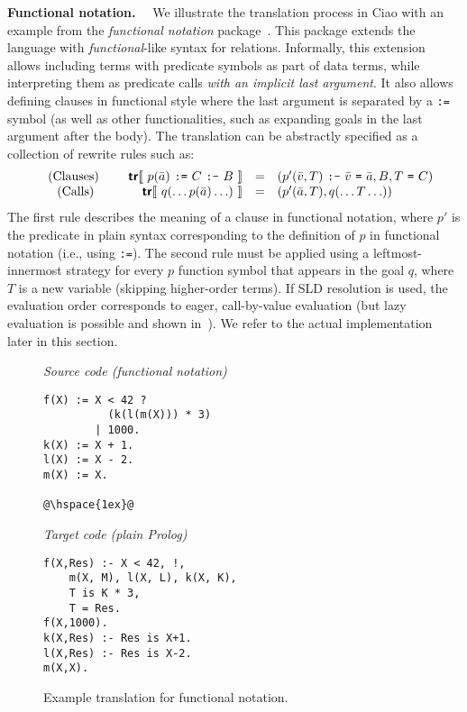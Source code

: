 \documentclass[preprint]{llncs}
\begin{document}
\vspace{1.5ex}
\noindent\textbf{Functional notation.}~~ We illustrate the translation
process in Ciao with an example from the \emph{functional notation}
package~\cite{functional-lazy-notation-flops2006}. This package extends
the language with \emph{functional}-like syntax for relations. Informally,
this extension allows including terms with predicate symbols as part of
data terms, while interpreting them as predicate calls \emph{with an
implicit last argument}. It also allows defining clauses in functional
style where the last argument is separated by a
\texttt{:=} symbol (as well as other functionalities, such as expanding
goals in the last argument after the body).  The translation can be
abstractly specified as a collection of rewrite rules such as:
\begin{displaymath}
  \begin{array}{crcl}
    \mbox{\ \ \ (Clauses) \ \ \ } & \mbox{\textsf{\textbf{tr}}}\llbracket~p(\bar{a}) ~\mbox{\tt :=}~ C ~\mbox{\tt :-}~ B~\rrbracket & = & (p'(\bar{v}, T) ~\mbox{\tt :-}~ \bar{v} ~\mbox{\tt =}~ \bar{a}, B, T~\mbox{\tt =}~C) \\
    \mbox{(Calls)} & \mbox{\textsf{\textbf{tr}}}\llbracket~q(\ldots p(\bar{a}) \ldots)~\rrbracket & = & (p'(\bar{a},T), q(\ldots T \ldots)) \\
  \end{array}
\end{displaymath}
The first rule describes the meaning of a clause in functional
notation, where $p'$ is the predicate in plain syntax 
corresponding to the definition of $p$ in functional notation (i.e.,
using \texttt{:=}). The second 
rule must be applied using a leftmost-innermost strategy for every $p$
function symbol that appears in the goal $q$, where $T$ is a new
variable (skipping higher-order terms).
If SLD resolution is used, the evaluation order corresponds to eager,
call-by-value evaluation (but lazy evaluation is possible and shown
in~\cite{functional-lazy-notation-flops2006}). 
We refer to the actual implementation later in this section.

\begin{figure}[t]
  \centering\small
  \begin{minipage}{0.45\linewidth}
    \emph{Source code (functional notation)}
\begin{lstlisting}[numbers=none,frame=r]
f(X) := X < 42 ?          
          (k(l(m(X))) * 3)
        | 1000.           
k(X) := X + 1.
l(X) := X - 2.
m(X) := X.

@\hspace{1ex}@
\end{lstlisting}
  \end{minipage}
  \hspace{1ex}
  \begin{minipage}{0.45\linewidth}
    \emph{Target code (plain Prolog)}
\begin{lstlisting}[numbers=none,frame=none]
f(X,Res) :- X < 42, !, 
    m(X, M), l(X, L), k(X, K),
    T is K * 3,
    T = Res.
f(X,1000).
k(X,Res) :- Res is X+1. 
l(X,Res) :- Res is X-2.
m(X,X).
\end{lstlisting}
  \end{minipage}
  \caption{Example translation for functional notation.}
  \label{fig:functional}
\end{figure}
\end{document}
